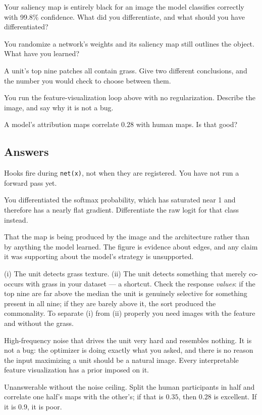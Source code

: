 \documentclass[11pt]{article}
\begin{document}
 Your saliency map is entirely black for an image the model classifies
correctly with 99.8\% confidence. What did you differentiate, and what should
you have differentiated?

 You randomize a network's weights and its saliency map still outlines
the object. What have you learned?

 A unit's top nine patches all contain grass. Give two different
conclusions, and the number you would check to choose between them.

 You run the feature-visualization loop above with no regularization.
Describe the image, and say why it is not a bug.

 A model's attribution maps correlate $0.28$ with human maps. Is that
good?

\subsection*{Answers}

 Hooks fire during \texttt{net(x)}, not when they are registered. You
have not run a forward pass yet.

 You differentiated the softmax probability, which has saturated near 1
and therefore has a nearly flat gradient. Differentiate the raw logit for that
class instead.

 That the map is being produced by the image and the architecture rather
than by anything the model learned. The figure is evidence about edges, and any
claim it was supporting about the model's strategy is unsupported.

 (i) The unit detects grass texture. (ii) The unit detects something that
merely co-occurs with grass in your dataset --- a shortcut. Check the response
\emph{values}: if the top nine are far above the median the unit is genuinely
selective for something present in all nine; if they are barely above it, the
sort produced the commonality. To separate (i) from (ii) properly you need
images with the feature and without the grass.

 High-frequency noise that drives the unit very hard and resembles
nothing. It is not a bug: the optimizer is doing exactly what you asked, and
there is no reason the input maximizing a unit should be a natural image. Every
interpretable feature visualization has a prior imposed on it.

 Unanswerable without the noise ceiling. Split the human participants in
half and correlate one half's maps with the other's; if that is $0.35$, then
$0.28$ is excellent. If it is $0.9$, it is poor.
\end{document}
